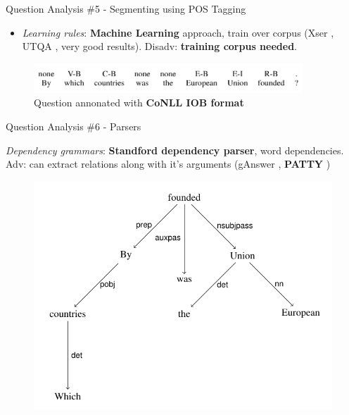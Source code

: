 \documentclass{beamer}
\begin{document}

\begin{frame}{Question Analysis \#5 - Segmenting using POS Tagging}
  \begin{card}
    \begin{itemize}
      \item \textit{Learning rules}: \textbf{Machine Learning} approach, train over corpus (Xser \cite{xu2014a}, UTQA \cite{pouran2016a}, very good results). Disadv: \textbf{training corpus needed}.
    \end{itemize}
    \begin{figure}\label{fig:conll_tagging}
      \centering
      \includegraphics[width=0.9\textwidth]{./res/conll.png}
      \caption{Question annonated with \textbf{CoNLL IOB format}}
    \end{figure}
  \end{card}
\end{frame}


\begin{frame}{Question Analysis \#6 - Parsers}
  \begin{cardTiny} 
    \textit{Dependency grammars}: \textbf{Standford dependency parser}, word dependencies. Adv: can extract relations along with it's arguments (gAnswer \cite{zou2014a}, \textbf{PATTY} \cite{nakashole2012a})
    \begin{figure}\label{fig:standford}
      \centering
      \includegraphics[height=0.57\textheight]{./res/standford.png}
    \end{figure}
  \end{cardTiny}
\end{frame}
\end{document}
